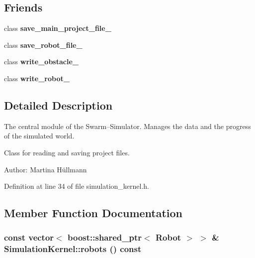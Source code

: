 \subsection*{Friends}
\begin{CompactItemize}
\item 
\hypertarget{class_simulation_kernel_0f35710cb67a4ed772bedc38abb66fda}{
class \textbf{save\_\-main\_\-project\_\-file\_}}
\label{class_simulation_kernel_0f35710cb67a4ed772bedc38abb66fda}

\item 
\hypertarget{class_simulation_kernel_7139ec7291f4c3b20402943c2b664758}{
class \textbf{save\_\-robot\_\-file\_}}
\label{class_simulation_kernel_7139ec7291f4c3b20402943c2b664758}

\item 
\hypertarget{class_simulation_kernel_1c533f013e578e25f6831e9076855ec8}{
class \textbf{write\_\-obstacle\_}}
\label{class_simulation_kernel_1c533f013e578e25f6831e9076855ec8}

\item 
\hypertarget{class_simulation_kernel_32c332247c653074ebf0439d6eabfba8}{
class \textbf{write\_\-robot\_}}
\label{class_simulation_kernel_32c332247c653074ebf0439d6eabfba8}

\end{CompactItemize}


\subsection{Detailed Description}
The central module of the Swarm–Simulator. Manages the data and the progress of the simulated world. 

Class for reading and saving project files.

\begin{Desc}
\item[Author:]Martina Hüllmann \end{Desc}


Definition at line 34 of file simulation\_\-kernel.h.

\subsection{Member Function Documentation}
\hypertarget{class_simulation_kernel_33dcfe76bf0c0e0cf980c7a6ccdd817b}{
\subsubsection[robots]{\setlength{\rightskip}{0pt plus 5cm}const vector$<$ boost::shared\_\-ptr$<$ Robot $>$ $>$ \& SimulationKernel::robots () const}}
\label{class_simulation_kernel_33dcfe76bf0c0e0cf980c7a6ccdd817b}


